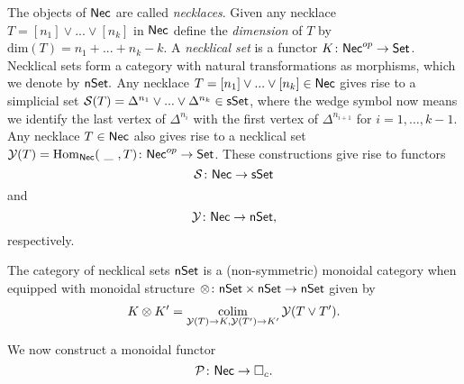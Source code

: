 The objects of $\mathsf{Nec}$ are called \textit{necklaces}. Given any necklace $T=[n_1] \vee ... \vee[n_k]$ in $\mathsf{Nec}$ define the \textit{dimension} of $T$ by $\text{dim}(T)=n_1+ ...+n_k-k$. A \textit{necklical set} is a functor $K \colon \mathsf{Nec}^{op} \to \mathsf{Set}$. Necklical sets form a category with natural transformations as morphisms, which we denote by $\mathsf{nSet}.$ Any necklace $T=[n_1] \vee ... \vee[n_k] \in \mathsf{Nec}$ gives rise to a simplicial set $\mathcal{S}(T)= \Delta^{n_1} \vee... \vee \Delta^{n_k} \in \mathsf{sSet}$, where the wedge symbol now means we identify the last vertex of $\Delta^{n_i}$ with the first vertex of $\Delta^{n_{i+1}}$ for $i=1,\dots,k-1$. Any necklace $T \in \mathsf{Nec}$ also gives rise to a necklical set $\mathcal{Y}(T)=\mathrm{Hom}_{\mathsf{Nec}}(\text{ \_ }, T) \colon \mathsf{Nec}^{op} \to \mathsf{Set}$. These constructions give rise to functors 
$$\mathcal{S} \colon \mathsf{Nec} \to \mathsf{sSet}$$
and
$$\mathcal{Y} \colon \mathsf{Nec} \to \mathsf{nSet},$$ respectively. 

The category of necklical sets $\mathsf{nSet}$ is a (non-symmetric) monoidal category when equipped with monoidal structure $\otimes\colon \mathsf{nSet} \times \mathsf{nSet} \to \mathsf{nSet}$ given by $$K \otimes K' = \operatorname*{colim}_{\mathcal{Y}(T) \to K, \mathcal{Y}(T')\to K'} \mathcal{Y}(T \vee T').$$

We now construct a monoidal functor
$$\mathcal{P} \colon \mathsf{Nec} \to \square_c.$$

